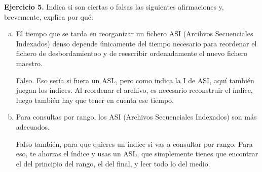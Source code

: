 \documentclass[12pt]{report}
\begin{document}
\textbf{Ejercicio 5.} Indica si son ciertas o falsas las siguientes afirmaciones y, brevemente, explica por qué:
\begin{enumerate}[(a)]
\item El tiempo que se tarda en reorganizar un fichero ASI (Arcihvos Secuenciales Indexados) denso depende únicamente del tiempo necesario para reordenar el fichero de desbordamientoo y de reescribir ordenadamente el nuevo fichero maestro.

Falso. Eso sería si fuera un ASL, pero como indica la I de ASI, aquí también juegan los índices. Al reordenar el archivo, es necesario reconstruir el índice, luego también hay que tener en cuenta ese tiempo.
\item Para consultas por rango, los ASI (Archivos Secuenciales Indexados) son  más adecuados.

Falso también, para que quieres un índice si vas a consultar por rango. Para eso, te ahorras el índice y usas un ASL, que simplemente tienes que encontrar el del principio del rango, el del final, y leer todo lo del medio.
\end{enumerate} 
\end{document}

